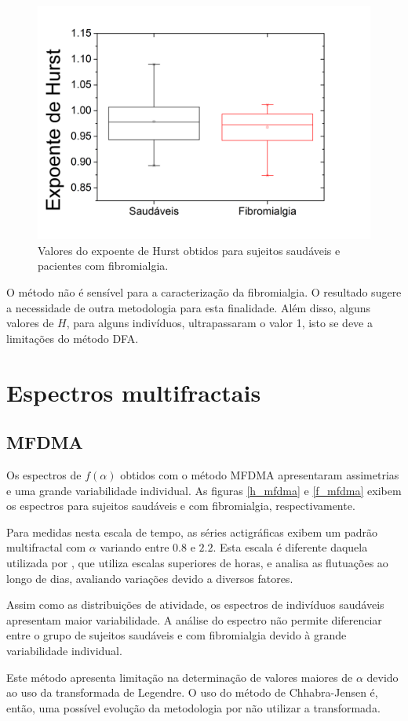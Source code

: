 \documentclass{ufscThesis}
\begin{document}
\begin{figure}[!h]
\centering
\includegraphics[scale=0.3]{hurst_hm_fm.png}
\caption{Valores do expoente de Hurst obtidos para sujeitos saudáveis e pacientes com fibromialgia.}
\label{hurst_hm_fm}
\end{figure}

O método não é sensível para a caracterização da fibromialgia. O resultado sugere a necessidade de outra metodologia para esta finalidade. Além disso, alguns valores de $H$, para alguns indivíduos, ultrapassaram o valor 1, isto se deve a limitações do método DFA.

\section{Espectros multifractais}

\subsection{MFDMA}

Os espectros de $f(\alpha)$ obtidos com o método MFDMA apresentaram assimetrias e uma grande variabilidade individual. As figuras \ref{h_mfdma} e \ref{f_mfdma} exibem os espectros para sujeitos saudáveis e com fibromialgia, respectivamente. \par
Para medidas nesta escala de tempo, as séries actigráficas exibem um padrão multifractal com $\alpha$ variando entre $0.8$ e $2.2$. Esta escala é diferente daquela utilizada por , que utiliza escalas superiores de horas, e analisa as flutuações ao longo de dias, avaliando variações devido a diversos fatores. \par
Assim como as distribuições de atividade, os espectros de indivíduos saudáveis apresentam maior variabilidade. A análise do espectro não permite diferenciar entre o grupo de sujeitos saudáveis e com fibromialgia devido à grande variabilidade individual. \par
Este método apresenta limitação na determinação de valores maiores de $\alpha$ devido ao uso da transformada de Legendre. O uso do método de Chhabra-Jensen é, então, uma possível evolução da metodologia por não utilizar a transformada.
\end{document}
